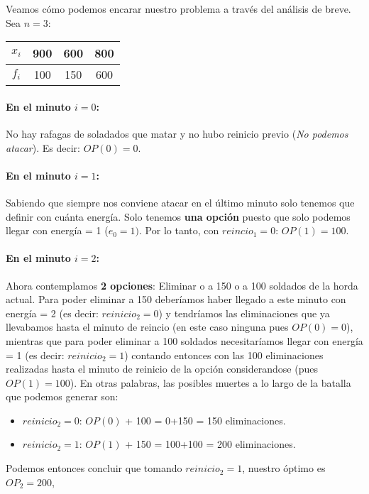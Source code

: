 \setlength{\parindent}{0cm}Veamos cómo podemos encarar nuestro problema a través del análisis de breve. Sea $n = 3$:

\begin{center}
\begin{tabular}{ |c|c|c|c| }
\hline
\textbf{$x_i$} & 900 & 600 & 800 \\ \hline
\textbf{$f_i$} & 100 & 150 & 600 \\
\hline
\end{tabular}
\end{center}

\paragraph{En el minuto $i=0$:} No hay rafagas de soladados que matar y no hubo reinicio previo (\textit{No podemos atacar}). Es decir: $OP(0)=0$.

\paragraph{En el minuto $i=1$:} Sabiendo que siempre nos conviene atacar en el último minuto solo tenemos que definir con cuánta energía. Solo tenemos \textbf{una opción} puesto que solo podemos llegar con energía = 1 ($e_0=1)$. Por lo tanto, con  $reincio_1=0$: $OP(1)=100$.


\paragraph{En el minuto $i=2$:} Ahora contemplamos \textbf{2 opciones}: Eliminar o a 150 o a 100 soldados de la horda actual. Para poder eliminar a 150 deberíamos haber llegado a este minuto con energía = 2 (es decir: $reinicio_2=0$) y tendríamos las eliminaciones que ya llevabamos hasta el minuto de reincio (en este caso ninguna pues $OP(0)=0$), mientras que para poder eliminar a 100 soldados necesitaríamos llegar con energía = 1 (es decir: $reinicio_2=1$) contando entonces con las 100 eliminaciones realizadas hasta el minuto de reinicio de la opción considerandose (pues $OP(1)=100$). En otras palabras, las posibles muertes a lo largo de la batalla que podemos generar son:

\begin{itemize}
    \item $reinicio_2=0$: $OP(0)$ + 100 = 0+150 = 150 eliminaciones.
    \item $reinicio_2=1$: $OP(1)$ + 150 = 100+100 = 200 eliminaciones.
\end{itemize}
Podemos entonces concluir que tomando $reinicio_2=1$, nuestro óptimo es $OP_2 = 200$,

